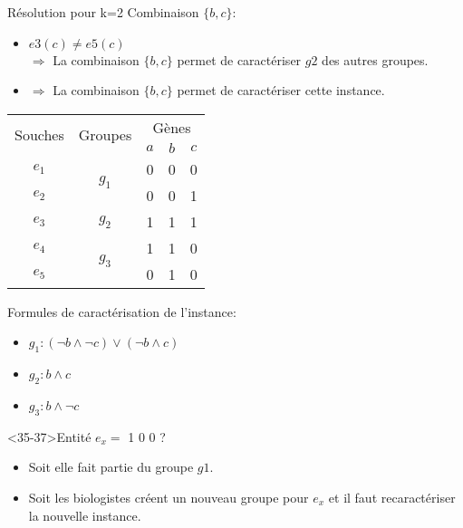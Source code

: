 \begin{overprint}
{			\hspace{0.6cm}
			\begin{minipage}[r]{0.46\linewidth}
				\begin{block}{Résolution pour k=2}
					Combinaison $\{b,c\}$:
					\begin{itemize}
						\item $e3(c) \not = e5(c) $ \\ $\Rightarrow$ La combinaison $\{b,c\}$ permet de caractériser $g2$ des autres groupes.
						\item<31> $\Rightarrow$ La combinaison $\{b,c\}$ permet de caractériser cette instance.
					\end{itemize}
				\end{block}
			\end{minipage}
		}
		{
			\begin{minipage}[l]{0.46\linewidth}
				\begin{center}
					\begin{tabular}{|c||c|c|c|c|}
						\hline
						\multirow{2}{*}{Souches}&\multirow{2}{*}{Groupes}&\multicolumn{3}{c|}{Gènes
						}\\
						&&$a$&$b$&$c$\\
						\hline
						\hline
						$e_1$&\multirow{2}{*}{$g_1$}& 0 & 0 & 0\\
						\cline{1-1} \cline{3-5}
						$e_2$&& 0 & 0 & 1\\
						\hline
						\hline
						$e_3$&$g_2$& 1 &  1 & 1\\
						\hline
						\hline
						$e_4$&\multirow{2}{*}{$g_3$}& 1 & 1 & 0\\
						\cline{1-1} \cline{3-5}
						$e_5$&& 0 & 1 & 0\\
						\hline
					\end{tabular}
				\end{center}
			\end{minipage}
			\hspace{0.4cm}
			\begin{minipage}[r]{0.46\linewidth}
				Formules de caractérisation de l'instance:
				\begin{itemize}
					\item $g_1:(\lnot b \land \lnot c) \lor (\lnot b \land c)$
					\item<33-37> $g_2: b \land c$
					\item<34-37> $g_3: b \land \lnot c$ 
				\end{itemize}			
			\end{minipage}
			\begin{alertblock}<35-37>{Entité $e_x =$ 1 0 0 ?}
			  \begin{itemize}
			    \item<36-37> Soit elle fait partie du groupe $g1$.
			    \item<37> Soit les biologistes créent un nouveau groupe pour $e_x$ et il faut recaractériser la nouvelle instance.
			  \end{itemize}
			\end{alertblock}
		}
	\end{overprint}